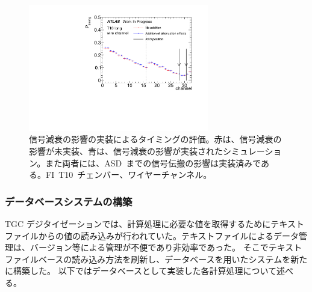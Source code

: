 \begin{figure}[H]
    \centering   
    \includegraphics[width=0.7\textwidth,page=1]{img/plot/att.pdf}
    \caption[信号減衰の影響の実装によるタイミングの評価]{信号減衰の影響の実装によるタイミングの評価。赤は、信号減衰の影響が未実装、青は、信号減衰の影響が実装されたシミュレーション。また両者には、ASD~までの信号伝搬の影響は実装済みである。FI~T10~チェンバー、ワイヤーチャンネル。}
    \label{fig:att}
\end{figure}

\subsubsection{データベースシステムの構築}
TGC デジタイゼーションでは、計算処理に必要な値を取得するためにテキストファイルからの値の読み込みが行われていた。テキストファイルによるデータ管理は、バージョン等による管理が不便であり非効率であった。
そこでテキストファイルベースの読み込み方法を刷新し、データベースを用いたシステムを新たに構築した。
以下ではデータベースとして実装した各計算処理について述べる。

